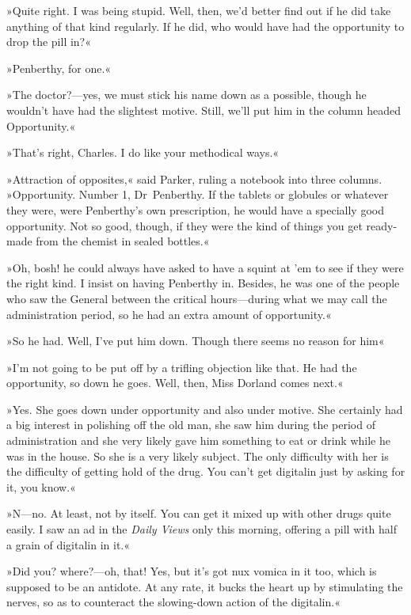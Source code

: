»Quite right. I was being stupid. Well, then, we'd better find out if he did take anything of that kind regularly. If he did, who would have had the opportunity to drop the pill in?«

»Penberthy, for one.«

»The doctor?—yes, we must stick his name down as a possible, though he wouldn't have had the slightest motive. Still, we'll put him in the column headed Opportunity.«

»That's right, Charles. I do like your methodical ways.«

»Attraction of opposites,« said Parker, ruling a notebook into three columns. »Opportunity. Number 1, Dr~Penberthy. If the tablets or globules or whatever they were, were Penberthy's own prescription, he would have a specially good opportunity. Not so good, though, if they were the kind of things you get ready-made from the chemist in sealed bottles.«

»Oh, bosh! he could always have asked to have a squint at 'em to see if they were the right kind. I insist on having Penberthy in. Besides, he was one of the people who saw the General between the critical hours—during what we may call the administration period, so he had an extra amount of opportunity.«

»So he had. Well, I've put him down. Though there seems no reason for him\longdash«

»I'm not going to be put off by a trifling objection like that. He had the opportunity, so down he goes. Well, then, Miss Dorland comes next.«

»Yes. She goes down under opportunity and also under motive. She certainly had a big interest in polishing off the old man, she saw him during the period of administration and she very likely gave him something to eat or drink while he was in the house. So she is a very likely subject. The only difficulty with her is the difficulty of getting hold of the drug. You can't get digitalin just by asking for it, you know.«

»N—no. At least, not by itself. You can get it mixed up with other drugs quite easily. I saw an ad in the \textit{Daily Views} only this morning, offering a pill with half a grain of digitalin in it.«

»Did you? where?—oh, that! Yes, but it's got nux vomica in it too, which is supposed to be an antidote. At any rate, it bucks the heart up by stimulating the nerves, so as to counteract the slowing-down action of the digitalin.«

